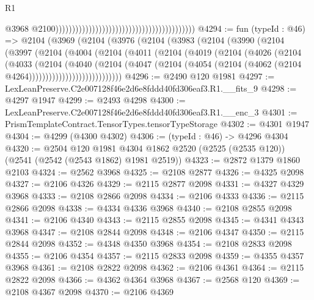 \begin{lexlean}{R1}
\begin{coremodule}
                                                                                        @3968
                                                                                        @2100))))))))))))))))))))))))))))))))))))))))))
@4294 := fun (typeId : @46) =>
  @2104
    (@3969
      (@2104
        (@3976
          (@2104
            (@3983
              (@2104
                (@3990
                  (@2104
                    (@3997
                      (@2104
                        (@4004
                          (@2104
                            (@4011
                              (@2104
                                (@4019
                                  (@2104
                                    (@4026
                                      (@2104
                                        (@4033
                                          (@2104
                                            (@4040
                                              (@2104
                                                (@4047
                                                  (@2104
                                                    (@4054
                                                      (@2104
                                                        (@4062
                                                          (@2104 @4264))))))))))))))))))))))))))))
@4296 := @2490 @120 @1981
@4297 := LexLeanPreserve.C2e007128f46e2d6e8fddd40fd306eaf3.R1.__fits_9
@4298 := @4297 @1947
@4299 := @2493 @4298
@4300 := LexLeanPreserve.C2e007128f46e2d6e8fddd40fd306eaf3.R1.__enc_3
@4301 := PrismTemplateContract.TensorTypes.tensorTypeStorage
@4302 := @4301 @1947
@4304 := @4299 (@4300 @4302)
@4306 := (typeId : @46) -> @4296 @4304
@4320 := @2504
    @120
    @1981
    @4304
    @1862
    @2520
    (@2525 (@2535 @120))
    (@2541 (@2542 (@2543 @1862) @1981 @2519))
@4323 := @2872 @1379 @1860 @2103
@4324 := @2562 @3968
@4325 := @2108 @2877
@4326 := @4325 @2098
@4327 := @2106 @4326
@4329 := @2115 @2877 @2098
@4331 := @4327 @4329 @3968
@4333 := @2108 @2866 @2098
@4334 := @2106 @4333
@4336 := @2115 @2866 @2098
@4338 := @4334 @4336 @3968
@4340 := @2108 @2855 @2098
@4341 := @2106 @4340
@4343 := @2115 @2855 @2098
@4345 := @4341 @4343 @3968
@4347 := @2108 @2844 @2098
@4348 := @2106 @4347
@4350 := @2115 @2844 @2098
@4352 := @4348 @4350 @3968
@4354 := @2108 @2833 @2098
@4355 := @2106 @4354
@4357 := @2115 @2833 @2098
@4359 := @4355 @4357 @3968
@4361 := @2108 @2822 @2098
@4362 := @2106 @4361
@4364 := @2115 @2822 @2098
@4366 := @4362 @4364 @3968
@4367 := @2568 @120
@4369 := @2108 @4367 @2098
@4370 := @2106 @4369

\end{coremodule}
\end{lexlean}
